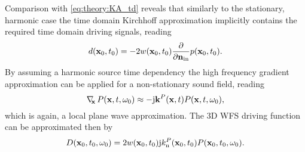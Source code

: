 Comparison with \eqref{eq:theory:KA_td} reveals that similarly to the stationary, harmonic case the time domain Kirchhoff approximation implicitly contains the required time domain driving signals, reading
\begin{equation}
\label{eq:moving_source:3D_wfs_driv_fun_td}
d(\mathbf{x}_0,t_0) =  -2 w(\mathbf{x}_0,t_0) \frac{\partial}{\partial \mathbf{n}_{\mathrm{in}}}  p(\mathbf{x}_0,t_0).
\end{equation}
By assuming a harmonic source time dependency the high frequency gradient approximation can be applied for a non-stationary sound field, reading
\begin{equation}
\nabla_{\!\!\mathbf{x}}\, P(\mathbf{x},t,\omega_0) \approx - \mathrm{j} \mathbf{k}^P(\mathbf{x},t) P(\mathbf{x},t,\omega_0),
\label{eq:moving_source:gradient_appr_nonstat}
\end{equation}
which is again, a local plane wave approximation.
The 3D WFS driving function can be approximated then by
\begin{equation}
\label{eq:moving_source:3D_wfs_driv_fun}
D(\mathbf{x}_0,t_0,\omega_0) =  2 w(\mathbf{x}_0,t_0) \mathrm{j} k_{\mathrm{n}}^P(\mathbf{x}_0,t_0) P(\mathbf{x}_0,t_0,\omega_0).
\end{equation}
	
